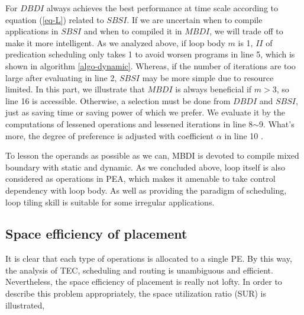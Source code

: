 \documentclass[10pt, conference, compsocconf]{IEEEtran}
\begin{document}
For $DBDI$ always achieves the best performance at time scale according to equation (\ref{eq-L}) related to $SBSI$. If we are uncertain when to compile applications in $SBSI$ and when to compiled it in $MBDI$, we will trade off to make it more intelligent. As we analyzed above, if loop body $m$ is 1, $II$ of predication scheduling only takes 1 to avoid worsen programs in line 5, which is shown in algorithm \ref{algo-dynamic}. Whereas, if the number of iterations are too large after evaluating in line 2, $SBSI$ may be more simple due to resource limited. In this part, we illustrate that $MBDI$ is always beneficial if $m>3$, so line 16 is accessible. Otherwise, a selection must be done from $DBDI$ and $SBSI$, just as saving time or saving power of which we prefer. We evaluate it by the computations of lessened  operations and lessened iterations  in line 8$\sim$9. What's more, the degree of preference is adjusted with coefficient $\alpha$ in line 10 .

To lesson the operands as possible as we can, MBDI is devoted to compile mixed boundary with static and dynamic. As we concluded above, loop itself is also considered as operations in PEA, which makes it amenable to take control dependency with loop body. As well as providing the paradigm of scheduling, loop tiling skill is suitable for some irregular applications.

\subsection{Space efficiency of placement}
It is clear that each type of operations is allocated to a single PE. By this way, the analysis of TEC, scheduling and routing is unambiguous and efficient. Nevertheless, the space efficiency of placement is really not lofty. In order to describe this problem appropriately, the space utilization ratio (SUR) is illustrated,
\end{document}

